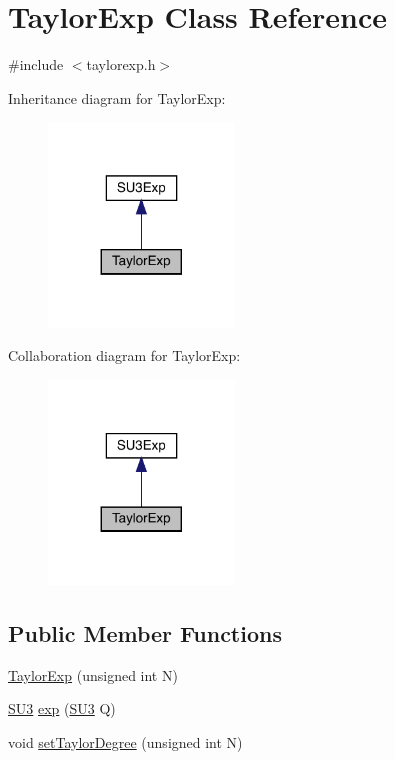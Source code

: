 \hypertarget{class_taylor_exp}{}\section{Taylor\+Exp Class Reference}
\label{class_taylor_exp}


{\ttfamily \#include $<$taylorexp.\+h$>$}



Inheritance diagram for Taylor\+Exp\+:\nopagebreak
\begin{figure}[H]
\begin{center}
\leavevmode
\includegraphics[width=140pt]{class_taylor_exp__inherit__graph}
\end{center}
\end{figure}


Collaboration diagram for Taylor\+Exp\+:\nopagebreak
\begin{figure}[H]
\begin{center}
\leavevmode
\includegraphics[width=140pt]{class_taylor_exp__coll__graph}
\end{center}
\end{figure}
\subsection*{Public Member Functions}
\begin{DoxyCompactItemize}
\item 
\mbox{\hyperlink{class_taylor_exp_ac8929cf53cb6b8d109220c8284169a82}{Taylor\+Exp}} (unsigned int N)
\item 
\mbox{\hyperlink{class_s_u3}{S\+U3}} \mbox{\hyperlink{class_taylor_exp_a622c4af7d88a43a7bcda97722b62fc82}{exp}} (\mbox{\hyperlink{class_s_u3}{S\+U3}} Q)
\item 
void \mbox{\hyperlink{class_taylor_exp_a6a048363483f372300e412b27f218773}{set\+Taylor\+Degree}} (unsigned int N)
\end{DoxyCompactItemize}


